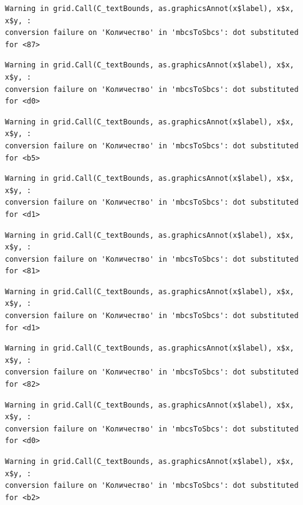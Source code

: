 \documentclass[
  letterpaper,
]{scrbook}
\theoremstyle{definition}
\theoremstyle{remark}
\begin{document}
\begin{verbatim}
Warning in grid.Call(C_textBounds, as.graphicsAnnot(x$label), x$x, x$y, :
conversion failure on 'Количество' in 'mbcsToSbcs': dot substituted for <87>
\end{verbatim}

\begin{verbatim}
Warning in grid.Call(C_textBounds, as.graphicsAnnot(x$label), x$x, x$y, :
conversion failure on 'Количество' in 'mbcsToSbcs': dot substituted for <d0>
\end{verbatim}

\begin{verbatim}
Warning in grid.Call(C_textBounds, as.graphicsAnnot(x$label), x$x, x$y, :
conversion failure on 'Количество' in 'mbcsToSbcs': dot substituted for <b5>
\end{verbatim}

\begin{verbatim}
Warning in grid.Call(C_textBounds, as.graphicsAnnot(x$label), x$x, x$y, :
conversion failure on 'Количество' in 'mbcsToSbcs': dot substituted for <d1>
\end{verbatim}

\begin{verbatim}
Warning in grid.Call(C_textBounds, as.graphicsAnnot(x$label), x$x, x$y, :
conversion failure on 'Количество' in 'mbcsToSbcs': dot substituted for <81>
\end{verbatim}

\begin{verbatim}
Warning in grid.Call(C_textBounds, as.graphicsAnnot(x$label), x$x, x$y, :
conversion failure on 'Количество' in 'mbcsToSbcs': dot substituted for <d1>
\end{verbatim}

\begin{verbatim}
Warning in grid.Call(C_textBounds, as.graphicsAnnot(x$label), x$x, x$y, :
conversion failure on 'Количество' in 'mbcsToSbcs': dot substituted for <82>
\end{verbatim}

\begin{verbatim}
Warning in grid.Call(C_textBounds, as.graphicsAnnot(x$label), x$x, x$y, :
conversion failure on 'Количество' in 'mbcsToSbcs': dot substituted for <d0>
\end{verbatim}

\begin{verbatim}
Warning in grid.Call(C_textBounds, as.graphicsAnnot(x$label), x$x, x$y, :
conversion failure on 'Количество' in 'mbcsToSbcs': dot substituted for <b2>
\end{verbatim}
\end{document}
